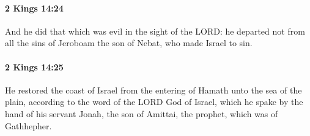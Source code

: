 		\paragraph{2 Kings 14:24} %
			\label{2KINGS-14-24}

			And he did that which was evil in the sight of the LORD: he departed not from all the sins of Jeroboam the son of Nebat, who made Israel to sin.


		\paragraph{2 Kings 14:25} %
			\label{2KINGS-14-25}

			He restored the coast of Israel from the entering of Hamath unto the sea of the plain, according to the word of the LORD God of Israel, which he spake by the hand of his servant Jonah, the son of Amittai, the prophet, which was of Gathhepher.

